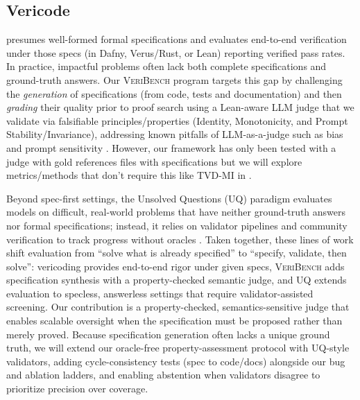 \documentclass{article}
\begin{document}
\subsection{Vericode}
\citet{bursuc2025benchmarkvericodingformallyverified} presumes well-formed formal specifications and evaluates end-to-end verification under those specs (in Dafny, Verus/Rust, or Lean) reporting verified pass rates.
In practice, impactful problems often lack both complete specifications and ground-truth answers.
Our \textsc{VeriBench} program targets this gap by challenging the \emph{generation} of specifications (from code, tests and documentation) and then \emph{grading} their quality prior to proof search using a Lean-aware LLM judge that we validate via falsifiable principles/properties (Identity, Monotonicity, and Prompt Stability/Invariance), addressing known pitfalls of LLM-as-a-judge such as bias and prompt sensitivity \citep{Zheng2023MTBench,Kocmi2024HumanVsLLM,Li2024TrustLLMJudgments}.
However, our framework has only been tested with a judge with gold references files with specifications but we will explore metrics/methods that don't require this like TVD-MI in \citep{robertson2025stepbystep}.

Beyond spec-first settings, the Unsolved Questions (UQ) paradigm evaluates models on difficult, real-world problems that have neither ground-truth answers nor formal specifications; instead, it relies on validator pipelines and community verification to track progress without oracles \cite{nie2025uqassessinglanguagemodels,uq2025}.
Taken together, these lines of work shift evaluation from “solve what is already specified” to “specify, validate, then solve”:
vericoding provides end-to-end rigor under given specs, \textsc{VeriBench} adds specification synthesis with a property-checked semantic judge, and UQ extends evaluation to specless, answerless settings that require validator-assisted screening.
Our contribution is a property-checked, semantics-sensitive judge that enables scalable oversight when the specification must be proposed rather than merely proved.
Because specification generation often lacks a unique ground truth, we will extend our oracle-free property-assessment protocol with UQ-style validators, adding cycle-consistency tests (spec to code/docs) alongside our bug and ablation ladders, and enabling abstention when validators disagree to prioritize precision over coverage.
\end{document}

